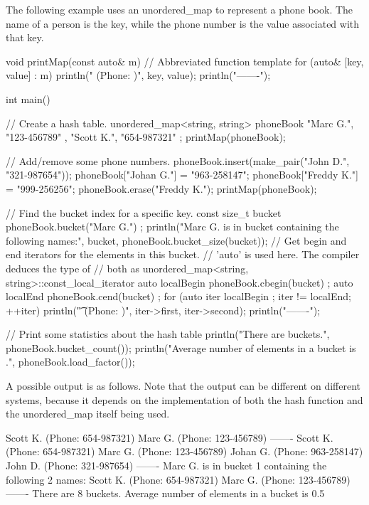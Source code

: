 
The following example uses an unordered\_map to represent a phone book. The name of a person is the key, while the phone number is the value associated with that key.

\begin{cpp}
void printMap(const auto& m) // Abbreviated function template
{
    for (auto& [key, value] : m) {
        println("{} (Phone: {})", key, value);
    }
    println("-------");
}

int main()
{
    // Create a hash table.
    unordered_map<string, string> phoneBook {
        { "Marc G.", "123-456789" },
        { "Scott K.", "654-987321" } };
    printMap(phoneBook);

    // Add/remove some phone numbers.
    phoneBook.insert(make_pair("John D.", "321-987654"));
    phoneBook["Johan G."] = "963-258147";
    phoneBook["Freddy K."] = "999-256256";
    phoneBook.erase("Freddy K.");
    printMap(phoneBook);

    // Find the bucket index for a specific key.
    const size_t bucket { phoneBook.bucket("Marc G.") };
    println("Marc G. is in bucket {} containing the following {} names:",
        bucket, phoneBook.bucket_size(bucket));
    // Get begin and end iterators for the elements in this bucket.
    // 'auto' is used here. The compiler deduces the type of
    // both as unordered_map<string, string>::const_local_iterator
    auto localBegin { phoneBook.cbegin(bucket) };
    auto localEnd { phoneBook.cend(bucket) };
    for (auto iter { localBegin }; iter != localEnd; ++iter) {
        println("\t{} (Phone: {})", iter->first, iter->second);
    }
    println("-------");

    // Print some statistics about the hash table
    println("There are {} buckets.", phoneBook.bucket_count());
    println("Average number of elements in a bucket is {}.",
    phoneBook.load_factor());
}
\end{cpp}

A possible output is as follows. Note that the output can be different on different systems, because it depends on the implementation of both the hash function and the unordered\_map itself being used.

\begin{shell}
Scott K. (Phone: 654-987321)
Marc G. (Phone: 123-456789)
-------
Scott K. (Phone: 654-987321)
Marc G. (Phone: 123-456789)
Johan G. (Phone: 963-258147)
John D. (Phone: 321-987654)
-------
Marc G. is in bucket 1 containing the following 2 names:
        Scott K. (Phone: 654-987321)
        Marc G. (Phone: 123-456789)
-------
There are 8 buckets.
Average number of elements in a bucket is 0.5
\end{shell}

